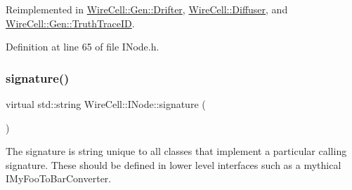 Reimplemented in \hyperlink{class_wire_cell_1_1_gen_1_1_drifter_a50935de34f9dd1171d76201b6081e9d7}{Wire\+Cell\+::\+Gen\+::\+Drifter}, \hyperlink{class_wire_cell_1_1_diffuser_abeacee310fe7c9ec3067c679319c33bd}{Wire\+Cell\+::\+Diffuser}, and \hyperlink{class_wire_cell_1_1_gen_1_1_truth_trace_i_d_aedeb529661e4353e8666b9b59395b7b5}{Wire\+Cell\+::\+Gen\+::\+Truth\+Trace\+ID}.



Definition at line 65 of file I\+Node.\+h.

\mbox{\label{class_wire_cell_1_1_i_node_a0b0763465adf5ba7febe8e378162b584}} 
\subsubsection{\texorpdfstring{signature()}{signature()}}
{\footnotesize\ttfamily virtual std\+::string Wire\+Cell\+::\+I\+Node\+::signature (\begin{DoxyParamCaption}{ }\end{DoxyParamCaption})\hspace{0.3cm}{\ttfamily [pure virtual]}}

The signature is string unique to all classes that implement a particular calling signature. These should be defined in lower level interfaces such as a mythical I\+My\+Foo\+To\+Bar\+Converter. 

